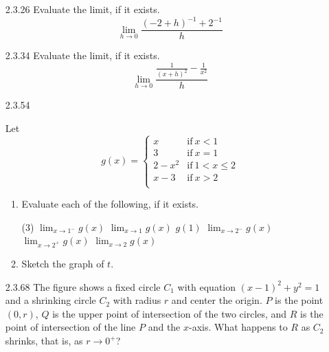\documentclass{article}
\begin{document}
\begin{enumerate}
    \vspace{5cm}

    \item[2.3.26]
        Evaluate the limit, if it exists.
        \[
            \lim_{h \to 0} \frac{(-2 + h)^{-1} + 2 ^{-1}}{h}
        \]

    \vspace{3cm}

    \item[2.3.34]
        Evaluate the limit, if it exists.
        \[
            \lim_{h \to 0} \frac{\frac{1}{(x+h)^2} - \frac{1}{x^2}}{h}
        \]
    \newpage

    \item[2.3.54]

        Let
        \begin{equation*}
            g(x) =
            \begin{cases}
                x & \text{if} \ x < 1\\
                3 & \text{if} \ x = 1\\
                2 - x^2 & \text{if} \ 1 < x \leq 2\\
                x -3 & \text{if} \ x > 2\\
            \end{cases}
        \end{equation*}

        \begin{enumerate}
            \item
                Evaluate each of the following, if it exists.
                \begin{tasks}[label=(\roman*), label-width=1.7em](3)
                    \task $\displaystyle \lim_{x \to 1^{-}} g(x)$
                    \task $\displaystyle \lim_{x \to 1} g(x)$
                    \task $\displaystyle g(1)$
                    \task $\displaystyle \lim_{x \to 2^{-}} g(x)$
                    \task $\displaystyle \lim_{x \to 2^{+}} g(x)$
                    \task $\displaystyle \lim_{x \to 2} g(x)$
                \end{tasks}
            \item
                Sketch the graph of $t$.
        \end{enumerate}

    \vspace{6cm}

    \item[2.3.68]
        The figure shows a fixed circle $C_1$ with equation
        $(x-1)^2 + y^2 = 1$ and a shrinking circle $C_2$
        with radius $r$ and center the origin.
        $P$ is the point $(0, r)$, $Q$ is the upper point
        of intersection of the two circles, and $R$
        is the point of intersection of the line $P$
        and the $x$-axis. What happens to $R$ as $C_2$ shrinks,
        that is, as $r \to 0^{+}$?


\end{enumerate}
\end{document}
